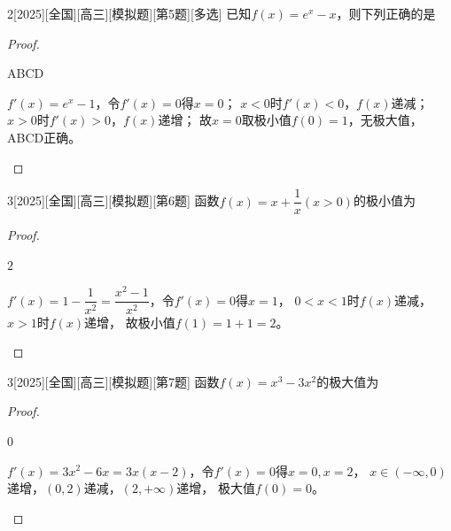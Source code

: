 \documentclass[
noshowanswers,        %
answercolor=red,    %
paper=a4,           %
sectioncolor=cyan,  %
subsectioncolor=cyan,
exercisecolor=orange, %
examplecolor=cyan,    %
bianshicolor=purple  %
]{biscuits}
\begin{document}
\begin{example}{2}[2025][全国][高三][模拟题][第5题][多选]
	已知$f(x)=e^x-x$，则下列正确的是\blankbox
	\begin{choices}
	\end{choices}
	\begin{proof}
		\begin{answer}
			ABCD
		\end{answer}
		\begin{solutions}
			$f'(x)=e^x-1$，令$f'(x)=0$得$x=0$；
			$x<0$时$f'(x)<0$，$f(x)$递减；$x>0$时$f'(x)>0$，$f(x)$递增；
			故$x=0$取极小值$f(0)=1$，无极大值，ABCD正确。
		\end{solutions}
	\end{proof}
\end{example}


\begin{example}{3}[2025][全国][高三][模拟题][第6题]
	函数$f(x)=x+\dfrac{1}{x}(x>0)$的极小值为\blankline
	\begin{proof}
		\begin{answer}
			$2$
		\end{answer}
		\begin{solutions}
			$f'(x)=1-\dfrac{1}{x^2}=\dfrac{x^2-1}{x^2}$，令$f'(x)=0$得$x=1$，
			$0<x<1$时$f(x)$递减，$x>1$时$f(x)$递增，
			故极小值$f(1)=1+1=2$。
		\end{solutions}
	\end{proof}
\end{example}

\begin{example}{3}[2025][全国][高三][模拟题][第7题]
	函数$f(x)=x^3-3x^2$的极大值为\blankline
	\begin{proof}
		\begin{answer}
			$0$
		\end{answer}
		\begin{solutions}
			$f'(x)=3x^2-6x=3x(x-2)$，令$f'(x)=0$得$x=0,x=2$，
			$x\in(-\infty,0)$递增，$(0,2)$递减，$(2,+\infty)$递增，
			极大值$f(0)=0$。
		\end{solutions}
	\end{proof}
\end{example}
\end{document}
